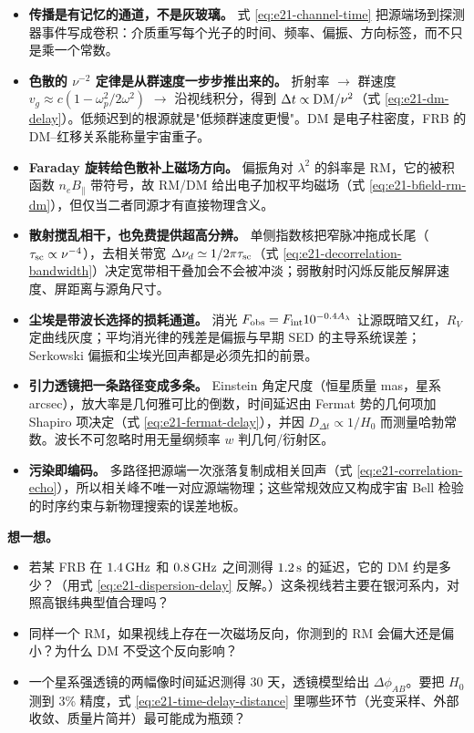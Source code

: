 \begin{itemize}
\item \textbf{传播是有记忆的通道，不是灰玻璃。} 式 \eqref{eq:e21-channel-time} 把源端场到探测器事件写成卷积：介质重写每个光子的时间、频率、偏振、方向标签，而不只是乘一个常数。
\item \textbf{色散的 \(\nu^{-2}\) 定律是从群速度一步步推出来的。} 折射率 \(\to\) 群速度 \(v_g\approx c(1-\omega_p^2/2\omega^2)\) \(\to\) 沿视线积分，得到 \(\Delta t\propto{\rm DM}/\nu^2\)（式 \eqref{eq:e21-dm-delay}）。低频迟到的根源就是"低频群速度更慢"。DM 是电子柱密度，FRB 的 DM–红移关系能称量宇宙重子。
\item \textbf{Faraday 旋转给色散补上磁场方向。} 偏振角对 \(\lambda^2\) 的斜率是 RM，它的被积函数 \(n_e B_\parallel\) 带符号，故 RM/DM 给出电子加权平均磁场（式 \eqref{eq:e21-bfield-rm-dm}），但仅当二者同源才有直接物理含义。
\item \textbf{散射搅乱相干，也免费提供超高分辨。} 单侧指数核把窄脉冲拖成长尾（\(\tau_{\rm sc}\propto\nu^{-4}\)），去相关带宽 \(\Delta\nu_d\simeq1/2\pi\tau_{\rm sc}\)（式 \eqref{eq:e21-decorrelation-bandwidth}）决定宽带相干叠加会不会被冲淡；弱散射时闪烁反能反解屏速度、屏距离与源角尺寸。
\item \textbf{尘埃是带波长选择的损耗通道。} 消光 \(F_{\rm obs}=F_{\rm int}10^{-0.4A_\lambda}\) 让源既暗又红，\(R_V\) 定曲线灰度；平均消光律的残差是偏振与早期 SED 的主导系统误差；Serkowski 偏振和尘埃光回声都是必须先扣的前景。
\item \textbf{引力透镜把一条路径变成多条。} Einstein 角定尺度（恒星质量 mas，星系 arcsec），放大率是几何雅可比的倒数，时间延迟由 Fermat 势的几何项加 Shapiro 项决定（式 \eqref{eq:e21-fermat-delay}），并因 \(D_{\Delta t}\propto1/H_0\) 而测量哈勃常数。波长不可忽略时用无量纲频率 \(w\) 判几何/衍射区。
\item \textbf{污染即编码。} 多路径把源端一次涨落复制成相关回声（式 \eqref{eq:e21-correlation-echo}），所以相关峰不唯一对应源端物理；这些常规效应又构成宇宙 Bell 检验的时序约束与新物理搜索的误差地板。
\end{itemize}

\medskip
\noindent\textbf{想一想。}
\begin{itemize}
\item 若某 FRB 在 \(1.4\,{\rm GHz}\) 和 \(0.8\,{\rm GHz}\) 之间测得 \(1.2\,{\rm s}\) 的延迟，它的 DM 约是多少？（用式 \eqref{eq:e21-dispersion-delay} 反解。）这条视线若主要在银河系内，对照高银纬典型值合理吗？
\item 同样一个 RM，如果视线上存在一次磁场反向，你测到的 RM 会偏大还是偏小？为什么 DM 不受这个反向影响？
\item 一个星系强透镜的两幅像时间延迟测得 \(30\) 天，透镜模型给出 \(\Delta\phi_{AB}\)。要把 \(H_0\) 测到 3\% 精度，式 \eqref{eq:e21-time-delay-distance} 里哪些环节（光变采样、外部收敛、质量片简并）最可能成为瓶颈？
\end{itemize}
